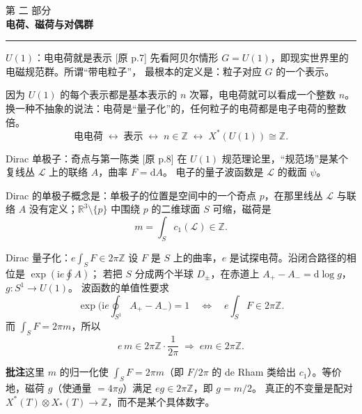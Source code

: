 \documentclass[aspectratio=169,12pt]{ctexbeamer}
\newcommand{\RR}{\mathbb{R}}
\newcommand{\ZZ}{\mathbb{Z}}
\newcommand{\cL}{\mathcal{L}}
\newcommand{\dd}{\mathrm{d}}
\newcommand{\ii}{\mathrm{i}}
\newcommand{\srcp}[1]{{\color{black!40}\scriptsize[原 p.#1]}}
\newcommand{\partframe}[2]{%
\begin{frame}[plain]
  \vspace*{2.6cm}
  {\color{black!35}\large 第 #1 部分}\\[0.8em]
  {\LARGE\bfseries #2}\\[1.2em]
  {\color{black!40}\rule{2.2cm}{0.4pt}}
\end{frame}}
\begin{document}
\partframe{二}{电荷、磁荷与对偶群}

\begin{frame}{$U(1)$：电电荷就是表示}
  \srcp{7} 先看阿贝尔情形 $G=U(1)$，即现实世界里的电磁规范群。所谓“带电粒子”，
  最根本的定义是：粒子对应 $G$ 的一个表示。
  \vspace{0.4em}

  因为 $U(1)$ 的每个表示都是基本表示的 $n$ 次幂，电电荷就可以看成一个整数 $n$。
  换一种不抽象的说法：电荷是“量子化”的，任何粒子的电荷都是电子电荷的整数倍。
  \[
    \text{电电荷}\;\longleftrightarrow\;\text{表示}\;\longleftrightarrow\; n\in\ZZ
    \;\longleftrightarrow\; X^*(U(1))\cong\ZZ .
  \]
\end{frame}

\begin{frame}{Dirac 单极子：奇点与第一陈类}
  \srcp{8} 在 $U(1)$ 规范理论里，“规范场”是某个复线丛 $\cL$ 上的联络 $A$，曲率 $F=\dd A$。
  电子的量子波函数是 $\cL$ 的截面 $\psi$。

  Dirac 的单极子概念是：单极子的位置是空间中的一个奇点 $p$，在那里线丛 $\cL$ 与联络 $A$
  没有定义；$\RR^3\setminus\{p\}$ 中围绕 $p$ 的二维球面 $S$ 可缩，磁荷是
  \[
    m=\int_S c_1(\cL)\in\ZZ .
  \]
  \begin{center}
  \end{center}
\end{frame}

\begin{frame}{Dirac 量子化：$e\int_S F\in2\pi\ZZ$}
  设 $F$ 是 $S$ 上的曲率，$e$ 是试探电荷。沿闭合路径的相位是 $\exp(\ii e\oint A)$；
  若把 $S$ 分成两个半球 $D_\pm$，在赤道上 $A_+-A_-=\dd\log g$，$g:S^1\to U(1)$。
  波函数的单值性要求
  \[
    \exp\!\Big(\ii e\oint_{S^1}A_+-A_-\Big)=1
    \quad\Longleftrightarrow\quad
    e\int_S F\in 2\pi\ZZ .
  \]
  而 $\int_S F=2\pi m$，所以
  \[
    e\,m\in 2\pi\ZZ\cdot\frac{1}{2\pi}\;\Longrightarrow\; em\in 2\pi\ZZ .
  \]
  \begin{beizhu}
  \textbf{批注}\quad 这里 $m$ 的归一化使 $\int_S F=2\pi m$（即 $F/2\pi$ 的 de Rham 类给出
  $c_1$）。等价地，磁荷 $g$（使通量 $=4\pi g$）满足 $eg\in2\pi\ZZ$，即 $g=m/2$。
  真正的不变量是配对 $X^*(T)\otimes X_*(T)\to\ZZ$，而不是某个具体数字。
  \end{beizhu}
\end{frame}
\end{document}
